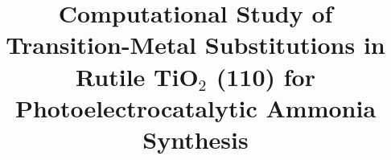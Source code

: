 



\makeatletter
\makeatother

\makeatletter
\makeatother
\title{Computational Study of Transition-Metal Substitutions in Rutile TiO$_2$ (110) for Photoelectrocatalytic Ammonia Synthesis}


